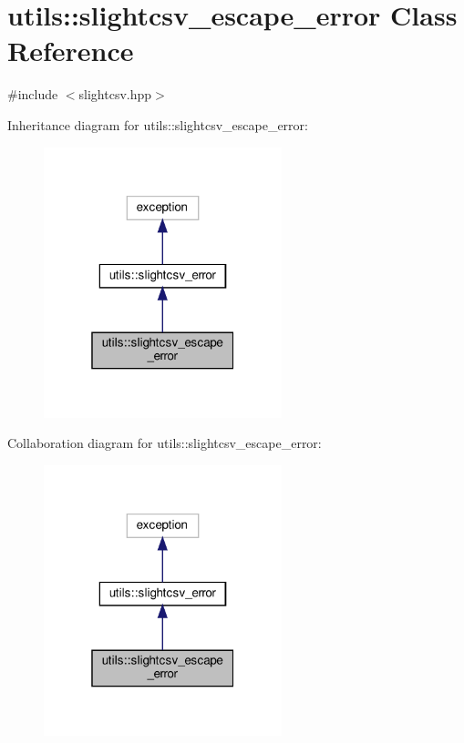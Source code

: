 \hypertarget{classutils_1_1slightcsv__escape__error}{}\section{utils\+:\+:slightcsv\+\_\+escape\+\_\+error Class Reference}
\label{classutils_1_1slightcsv__escape__error}


{\ttfamily \#include $<$slightcsv.\+hpp$>$}



Inheritance diagram for utils\+:\+:slightcsv\+\_\+escape\+\_\+error\+:\nopagebreak
\begin{figure}[H]
\begin{center}
\leavevmode
\includegraphics[width=196pt]{classutils_1_1slightcsv__escape__error__inherit__graph}
\end{center}
\end{figure}


Collaboration diagram for utils\+:\+:slightcsv\+\_\+escape\+\_\+error\+:\nopagebreak
\begin{figure}[H]
\begin{center}
\leavevmode
\includegraphics[width=196pt]{classutils_1_1slightcsv__escape__error__coll__graph}
\end{center}
\end{figure}



